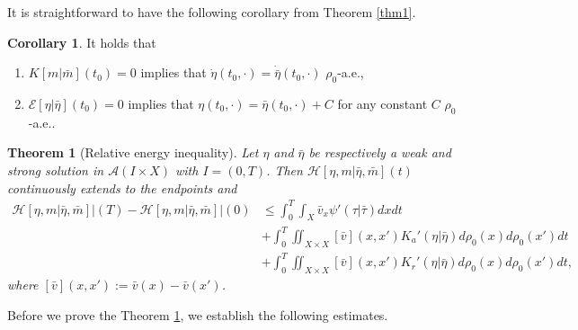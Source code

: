 \documentclass[10pt, letterpaper]{article}
\def\E{{\mathcal{E}}}
\def\H{{\mathcal{H}}}
\newtheorem{theorem}{Theorem}
\theoremstyle{definition}
\newtheorem{corollary}[subsubsection]{Corollary}
\theoremstyle{remark}
\begin{document}
It is straightforward to have the following corollary from Theorem \ref{thm1}.
\begin{corollary} It holds that
 \begin{enumerate}
  \item $K[m|\bar m](t_0) = 0$ implies that $\dot{\eta}(t_0,\cdot) = \dot{\bar\eta}(t_0,\cdot)$ $\rho_0$-a.e.,
  \item $\E[\eta|\bar \eta](t_0)=0$ implies that $\eta(t_0,\cdot) = \bar\eta(t_0,\cdot) + C$ for any constant $C$ $\rho_0$-a.e..
 \end{enumerate}
\end{corollary}    
\begin{theorem}[Relative energy inequality] \label{ineqthm}
    Let $\eta$ and $\bar\eta$ be respectively a weak and strong solution in $\mathcal{A}(I\times X)$ with $I=(0,T)$. Then $\H[\eta,m|\bar\eta, \bar{m}](t)$ continuously extends to the endpoints and 
    \begin{equation} \label{relineq}
        \begin{aligned}
            \left.\H[\eta, m|\bar{\eta}, \bar{m}]\right| (T) - \left.\H[\eta, m| \bar{\eta}, \bar{m}]\right| (0) & \leq  \int_0^T \int_X \bar{{v}}_x \psi'(\tau | \bar{\tau})dxdt  \\
            &  + \int_{0}^{T} \iint_{X \times X} [\bar{{v}}](x, x'){K}_a'(\eta | \bar\eta)d\rho_0(x)d\rho_0(x') dt \\
            &  + \int_{0}^{T} \iint_{X \times X} [\bar{{v}}](x, x'){K}_r'(\eta | \bar\eta)d\rho_0(x)d\rho_0(x') dt, 
        \end{aligned}
    \end{equation}
    where $[\bar{{v}}](x, x'):= \bar{{v}}(x) - \bar{{v}}(x')$.
\end{theorem}
Before we prove the Theorem \ref{ineqthm}, we establish the following estimates.
\end{document}
